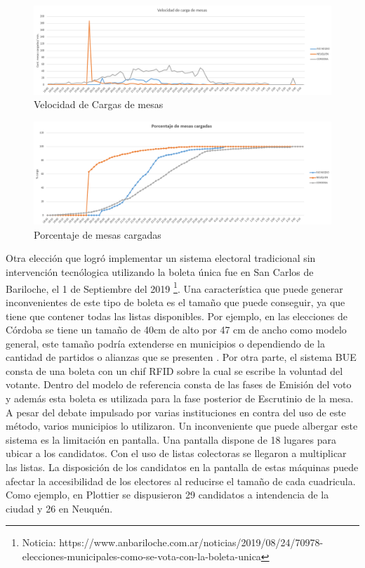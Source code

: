 \begin{figure}[h!]
  \includegraphics[width=\textwidth]{img/grafico_velocidad_carga.png}
  \caption{Velocidad de Cargas de mesas}
  \label{fig:velocidad}
\end{figure}
\begin{figure}[h!]
  \includegraphics[width=\textwidth]{img/carga_mesas.png}
  \caption{Porcentaje de mesas cargadas}
  \label{fig:acumulado}
\end{figure}

Otra elección que logró implementar un sistema electoral tradicional sin intervención tecnólogica utilizando la boleta única fue en San Carlos de Bariloche, el 1 de Septiembre del 2019 \footnote{Noticia: https://www.anbariloche.com.ar/noticias/2019/08/24/70978-elecciones-municipales-como-se-vota-con-la-boleta-unica}. Una característica que puede generar inconvenientes de este tipo de boleta es el tamaño que puede conseguir, ya que tiene que contener todas las listas disponibles. Por ejemplo, en las elecciones de Córdoba se tiene un tamaño de 40cm de alto por 47 cm de ancho como modelo general, este tamaño podría extenderse en municipios o dependiendo de la cantidad de partidos o alianzas que se presenten \cite{boletaUnicaTamanio}. \newline
Por otra parte, el sistema BUE consta de una boleta con un chif RFID sobre la cual se escribe la voluntad del votante. Dentro del modelo de referencia consta de las fases de Emisión del voto y además esta boleta es utilizada para la fase posterior de Escrutinio de la mesa. A pesar del debate impulsado por varias instituciones en contra del uso de este método, varios municipios lo utilizaron. Un inconveniente que puede albergar este sistema es la limitación en pantalla. Una pantalla dispone de 18 lugares para ubicar a los candidatos. Con el uso de listas colectoras se llegaron a multiplicar las listas. La disposición de los candidatos en la pantalla de estas máquinas puede afectar la accesibilidad de los electores al reducirse el tamaño de cada cuadricula. Como ejemplo, en Plottier \cite{lmncolectoras} se dispusieron 29 candidatos a intendencia de la ciudad y 26 en Neuquén. 
